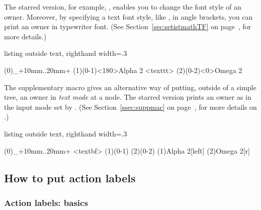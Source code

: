 The starred version, for example, , enables you to change the font style of an owner.
Moreover, by specifying a text font style, like , in angle brackets, you can print an owner in typewriter font. (See Section~\ref{sec:setistmathTF} on page~\pageref{sec:setistmathTF}, for more details.)

\begin{tcblisting}{listing outside text, righthand width=.3\linewidth}
\begin{istgame}
\istroot(0){\Omega_{\alpha}}+10mm..20mm+
                               \istb  \istb  \endist
{}          %
\istroot(1)(0-1)<180>{Alpha 2} \istb \istb \endist
{}<texttt> %
\istroot(2)(0-2)<0>{Omega 2}   \istb \istb \endist
\end{istgame}
\end{tcblisting}

The supplementary macro \cmd{\xtOwner} gives an alternative way of putting, outside of a simple tree, an owner in \emph{text mode} at a node.
The starred version \cmd{\xtOwner*} prints an owner as in the input mode set by \cmd{\setistmathTF*}.
(See Section~\ref{ssec:suppmac} on page~\pageref{ssec:suppmac}, for more details on \cmd{\xtOwner}.)

\begin{tcblisting}{listing outside text, righthand width=.3\linewidth}
\begin{istgame}
\istroot(0){\Omega_{\alpha}}+10mm..20mm+
                 \istb  \istb  \endist
{}<textbf>   %
\istroot(1)(0-1) \istb \istb \endist
\istroot(2)(0-2) \istb \istb \endist
\xtOwner*(1){Alpha 2}[left] %
\xtOwner(2){Omega 2}[r]     %
\end{istgame}
\end{tcblisting}


\subsection{How to put action labels}

\subsubsection{Action labels: basics}

